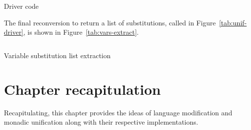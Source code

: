 \documentclass[thesis-solanki.tex]{subfiles}
\begin{document}
\begin{code-list}[H]
  \begin{singlespace}
    \inputminted[linenos]{haskell}{haskell-proto1-unify-driver.hs}
  \end{singlespace}
  \caption{Driver code}
  \label{tab:unif-driver}
\end{code-list}


The final reconversion to return a list of substitutions,
  called  in Figure~\ref{tab:unif-driver}, is shown in
  Figure~\ref{tab:vars-extract}.
\begin{code-list}[H]
  \begin{singlespace}
    \inputminted[linenos]{haskell}{haskell-proto1-unify-out.hs}
  \end{singlespace}
  \caption{Variable substitution list extraction}
  \label{tab:vars-extract}
\end{code-list}

\section{Chapter recapitulation}
Recapitulating, this chapter provides the ideas of language modification and monadic unification along with their respective 
implementations. 


\ifMain
\begin{scope}
  \nolinenumbers
  \enotesize
  \par
  \begin{singlespace}
  \setlength{\parskip}{12pt plus 2pt minus 1pt}
  \theendnotes
  \par
  \end{singlespace}
\end{scope}
\fi
\end{document}
